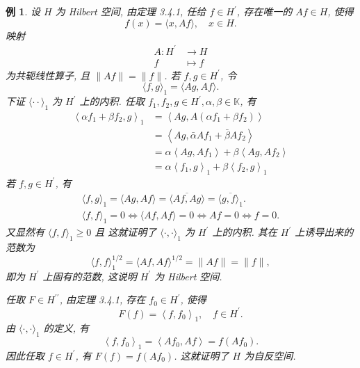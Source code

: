 \documentclass[openany]{ctexbook}
\theoremstyle{kaiti}
\theoremstyle{normal}
\newtheorem{example}{例}[section]
\begin{document}
\begin{example}
设 $H$ 为 Hilbert 空间, 由定理 3.4.1, 任给 $f \in H^{\prime}$, 存在唯一的 $A f \in H$, 使得
$$
f(x)=\langle x, A f\rangle, \quad x \in H.
$$
映射
$$
\begin{aligned}
A: H^{\prime} & \rightarrow H \\
f & \mapsto f
\end{aligned}
$$
为共轭线性算子, 且 $\|A f\|=\|f\|$. 若 $f, g \in H^{\prime}$, 令
$$
\langle f, g\rangle_1=\langle A g, A f\rangle.
$$
下证 $\langle\cdot \cdot\rangle_1$ 为 $H^{\prime}$ 上的内积. 任取 $f_1, f_2, g \in H^{\prime}, \alpha, \beta \in \mathbb{K}$, 有
$$
\begin{aligned}
\left\langle\alpha f_1+\beta f_2, g\right\rangle_1 &=\left\langle A g, A\left(\alpha f_1+\beta f_2\right)\right\rangle \\
&=\left\langle A g, \bar{\alpha} A f_1+\bar{\beta} A f_2\right\rangle \\
&=\alpha\left\langle A g, A f_1\right\rangle+\beta\left\langle A g, A f_2\right\rangle \\
&=\alpha\left\langle f_1, g\right\rangle_1+\beta\left\langle f_2, g\right\rangle_1
\end{aligned}
$$
若 $f, g \in H^{\prime}$, 有
$$
\begin{gathered}
\langle f, g\rangle_1=\langle A g, A f\rangle=\overline{\langle A f, A g\rangle}=\overline{\langle g, f\rangle_1}. \\
\langle f, f\rangle_1=0 \Leftrightarrow\langle A f, A f\rangle=0 \Leftrightarrow A f=0 \Leftrightarrow f=0.
\end{gathered}
$$
又显然有 $\langle f, f\rangle_1 \geqslant 0$ 且
这就证明了 $\langle\cdot, \cdot\rangle_1$ 为 $H^{\prime}$ 上的内积. 其在 $H^{\prime}$ 上诱导出来的范数为
$$
\langle f, f\rangle_1^{1 / 2}=\langle A f, A f\rangle^{1 / 2}=\|A f\|=\|f\|,
$$
即为 $H^{\prime}$ 上固有的范数, 这说明 $H^{\prime}$ 为 Hilbert 空间.

任取 $F \in H^{\prime \prime}$, 由定理 3.4.1, 存在 $f_0 \in H^{\prime}$, 使得
$$
F(f)=\left\langle f, f_0\right\rangle_1, \quad f \in H^{\prime}.
$$
由 $\langle\cdot, \cdot\rangle_1$ 的定义, 有
$$
\left\langle f, f_0\right\rangle_1=\left\langle A f_0, A f\right\rangle=f\left(A f_0\right).
$$
因此任取 $f \in H^{\prime}$, 有 $F(f)=f\left(A f_0\right)$. 这就证明了 $H$ 为自反空间.
\end{example}
\end{document}
